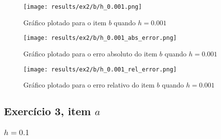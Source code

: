 \documentclass[12pt]{article}
\begin{document}
\begin{figure}[H]
    \texttt{[image: results/ex2/b/h\_0.001.png]}
    \caption{Gráfico plotado para o item $b$ quando $h=0.001$}
\end{figure}

\begin{figure}[H]
    \texttt{[image: results/ex2/b/h\_0.001\_abs\_error.png]}
    \caption{Gráfico plotado para o erro absoluto do item $b$ quando $h=0.001$}
\end{figure}

\begin{figure}[H]
    \texttt{[image: results/ex2/b/h\_0.001\_rel\_error.png]}
    \caption{Gráfico plotado para o erro relativo do item $b$ quando $h=0.001$}
\end{figure}
\subsection{Exercício 3, item $a$}\subsubsection{$h=0.1$}

\begin{table}[H]
    \centering
    \caption{Valores obtidos para o item $a$ com $h=0.1$}
\end{table}
\end{document}
